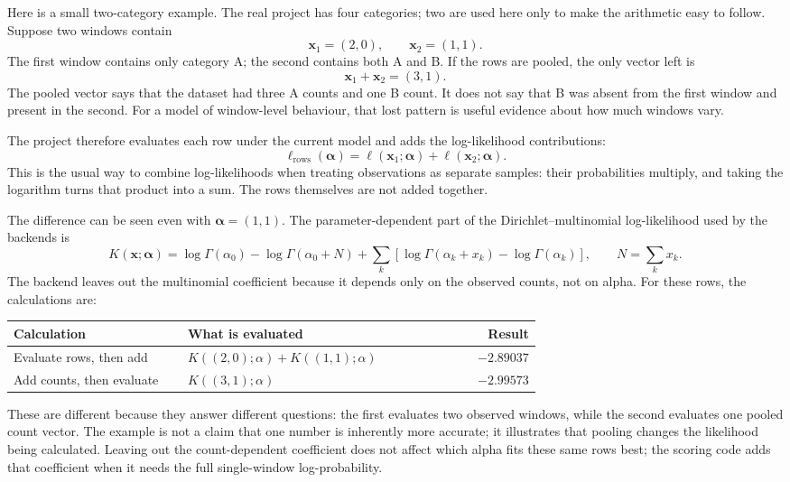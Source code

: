 \documentclass[11pt]{article}
\begin{document}
Here is a small two-category example. The real project has four categories;
two are used here only to make the arithmetic easy to follow. Suppose two
windows contain
\[
  \mathbf{x}_1=(2,0), \qquad \mathbf{x}_2=(1,1).
\]
The first window contains only category A; the second contains both A and B.
If the rows are pooled, the only vector left is
\[
  \mathbf{x}_1+\mathbf{x}_2=(3,1).
\]
The pooled vector says that the dataset had three A counts and one B count. It
does not say that B was absent from the first window and present in the second.
For a model of window-level behaviour, that lost pattern is useful evidence
about how much windows vary.

The project therefore evaluates each row under the current model and adds the
log-likelihood contributions:
\[
  \ell_{\mathrm{rows}}(\boldsymbol{\alpha})
  = \ell(\mathbf{x}_1;\boldsymbol{\alpha})
    + \ell(\mathbf{x}_2;\boldsymbol{\alpha}).
\]
This is the usual way to combine log-likelihoods when treating observations
as separate samples: their probabilities multiply, and taking the logarithm
turns that product into a sum. The rows themselves are not added together.

The difference can be seen even with \(\boldsymbol{\alpha}=(1,1)\). The
parameter-dependent part of the Dirichlet--multinomial log-likelihood used by
the backends is
\[
  K(\mathbf{x};\boldsymbol{\alpha})
  = \log\Gamma(\alpha_0)-\log\Gamma(\alpha_0+N)
    + \sum_k\left[\log\Gamma(\alpha_k+x_k)
                   -\log\Gamma(\alpha_k)\right],
  \qquad N=\sum_k x_k.
\]
The backend leaves out the multinomial coefficient because it depends only on
the observed counts, not on alpha. For these rows, the calculations are:

\begin{center}
\begin{tabular}{p{0.33\linewidth}p{0.35\linewidth}r}
\toprule
Calculation & What is evaluated & Result \\
\midrule
Evaluate rows, then add & \(K((2,0);\alpha)+K((1,1);\alpha)\) & \(-2.89037\) \\
Add counts, then evaluate & \(K((3,1);\alpha)\) & \(-2.99573\) \\
\bottomrule
\end{tabular}
\end{center}

These are different because they answer different questions: the first
evaluates two observed windows, while the second evaluates one pooled count
vector. The example is not a claim that one number is inherently more
accurate; it illustrates that pooling changes the likelihood being
calculated. Leaving out the count-dependent coefficient does not affect which
alpha fits these same rows best; the scoring code adds that coefficient when
it needs the full single-window log-probability.
\end{document}
